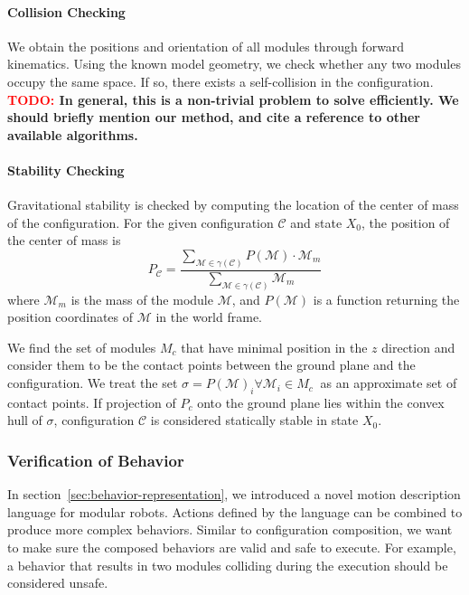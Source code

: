 \documentclass[conference]{IEEEtran}
\theoremstyle{definition}
\newcommand{\TODO}[1]{ {\bf \textcolor{red}{TODO:} #1 }}
\begin{document}
\paragraph{Collision Checking} 
We obtain the positions and orientation of all modules through forward kinematics.
Using the known model geometry, we  check whether any two modules occupy the same space. If so, there exists a self-collision in the configuration.
\TODO{In general, this is a non-trivial problem to solve efficiently.  We should
briefly mention our method, and cite a reference to other available algorithms.}
\paragraph{Stability Checking}
 Gravitational stability is checked by computing the location of the center of mass of the configuration. For the given configuration $\mathcal{C}$
and state \(X_0\), the position of the center of mass is
\begin{equation*}
 P_{\mathcal{C}}=\dfrac{\sum\limits_{\mathcal{M}\in \gamma(\mathcal{C})}{P(\mathcal{M})\cdot \mathcal{M}_m}}{\sum\limits_{\mathcal{M}\in \gamma(\mathcal{C})}{\mathcal{M}_m}}
\end{equation*}
where $\mathcal{M}_m$ is the mass of the module $\mathcal{M}$, and \(P(\mathcal{M})\)
is a function returning the position coordinates of \(\mathcal{M}\) in the world frame.

We find the set of modules $M_c$ that have minimal position in the $z$ direction and consider them to
be the contact points between the ground plane and the configuration. We treat the
set \( \sigma = P(\mathcal{M})_i \forall \mathcal{M}_i \in M_c \ \) as an approximate set of contact points.
If projection of \(P_c\) onto the ground plane lies within the convex hull of \(\sigma\),
 configuration $\mathcal{C}$ is considered statically stable in state \(X_0\).

\subsubsection{Verification of Behavior}
In section~\ref{sec:behavior-representation}, we introduced a novel motion description language for modular robots. Actions defined by the language can be combined to produce more complex behaviors. Similar to configuration composition, we want to make sure the composed behaviors are valid and safe to execute. For example, a behavior that results in two modules colliding during the execution should be considered unsafe.
\end{document}
